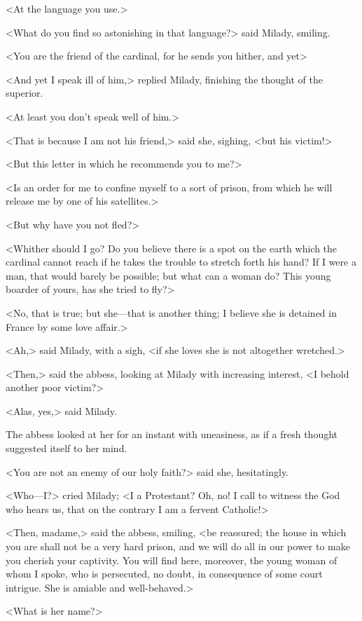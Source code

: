 <At the language you use.> 

<What do you find so astonishing in that language?> said Milady, smiling. 

<You are the friend of the cardinal, for he sends you hither, and yet\longdash> 

<And yet I speak ill of him,> replied Milady, finishing the thought of the superior. 

<At least you don't speak well of him.> 

<That is because I am not his friend,> said she, sighing, <but his victim!> 

<But this letter in which he recommends you to me?> 

<Is an order for me to confine myself to a sort of prison, from which he will release me by one of his satellites.> 

<But why have you not fled?> 

<Whither should I go? Do you believe there is a spot on the earth which the cardinal cannot reach if he takes the trouble to stretch forth his hand? If I were a man, that would barely be possible; but what can a woman do? This young boarder of yours, has she tried to fly?> 

<No, that is true; but she---that is another thing; I believe she is detained in France by some love affair.> 

<Ah,> said Milady, with a sigh, <if she loves she is not altogether wretched.> 

<Then,> said the abbess, looking at Milady with increasing interest, <I behold another poor victim?> 

<Alas, yes,> said Milady. 

The abbess looked at her for an instant with uneasiness, as if a fresh thought suggested itself to her mind. 

<You are not an enemy of our holy faith?> said she, hesitatingly. 

<Who---I?> cried Milady; <I a Protestant? Oh, no! I call to witness the God who hears us, that on the contrary I am a fervent Catholic!> 

<Then, madame,> said the abbess, smiling, <be reassured; the house in which you are shall not be a very hard prison, and we will do all in our power to make you cherish your captivity. You will find here, moreover, the young woman of whom I spoke, who is persecuted, no doubt, in consequence of some court intrigue. She is amiable and well-behaved.> 

<What is her name?> 

